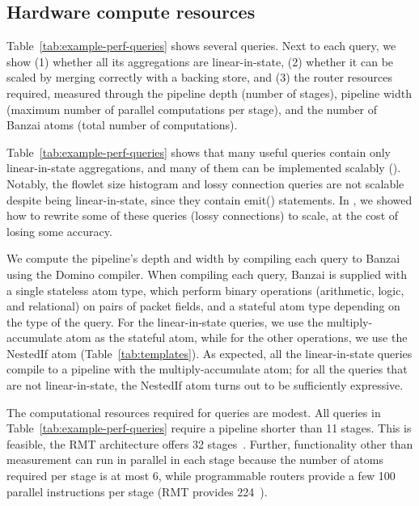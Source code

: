 \subsection{Hardware compute resources}
\label{s:eval:hardware}
\label{sec:eval:hardware}

Table~\ref{tab:example-perf-queries} shows several \TheSystem queries.  Next to
each query, we show (1) whether all its aggregations are linear-in-state, (2)
whether it can be scaled by merging correctly with a backing store, and (3) the
router resources required, measured through the pipeline depth (number of
stages), pipeline width (maximum number of parallel computations per stage),
and the number of Banzai atoms (total number of computations).

Table~\ref{tab:example-perf-queries} shows that many useful queries contain
only linear-in-state aggregations, and many of them can be implemented scalably
(). Notably, the flowlet size histogram and
lossy connection queries are not scalable despite being linear-in-state, since
they contain {\ct emit()} statements.  In , we
showed how to rewrite some of these queries (\eg lossy connections) to scale,
at the cost of losing some accuracy.

We compute the pipeline's depth and width by compiling each query to Banzai
using the Domino compiler. When compiling each query, Banzai is supplied with a
single stateless atom type, which perform binary operations (arithmetic, logic,
and relational) on pairs of packet fields, and a stateful atom type depending
on the type of the query.  For the linear-in-state queries, we use the
multiply-accumulate atom as the stateful atom, while for the other operations,
we use the NestedIf atom (Table~\ref{tab:templates}). As expected, all the
linear-in-state queries compile to a pipeline with the multiply-accumulate
atom; for all the queries that are not linear-in-state, the NestedIf atom turns
out to be sufficiently expressive.

The computational resources required for \TheSystem queries are modest.  All
queries in Table~\ref{tab:example-perf-queries} require a pipeline shorter than
11 stages.  This is feasible, \eg the RMT architecture offers 32
stages~\cite{rmt}. Further, functionality other than measurement can run in
parallel in each stage because the number of atoms required per stage is at
most 6, while programmable routers provide a few 100 parallel instructions per
stage (\eg RMT provides 224~\cite{rmt}).
